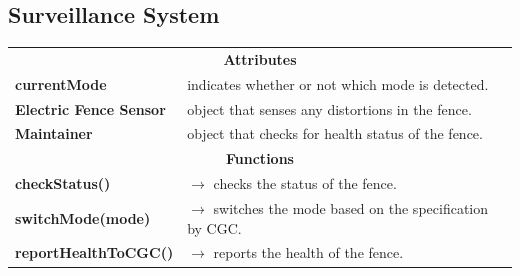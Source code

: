 \documentclass[12pt]{article}
\begin{document}
%

\subsection{Surveillance System}
\begin{table}[H]
\small
\begin{tabularx}{\hsize}{|X|X|}
    \hline
    \rowcolor{bigbrotheryellow}
    \multicolumn{2}{|c|}{\textbf{\texttt{ElectricFence}}} \\ 
    \hline
    \hline
    \multicolumn{2}{|c|}{\textbf{Attributes}}      \\
    \hline
    \textbf{currentMode} & indicates whether or not which mode is detected. \\
    \textbf{Electric Fence Sensor} &  object that senses any distortions in the fence.\\
    \textbf{Maintainer} &  object that checks for health status of the fence.\\
    \hline
    \multicolumn{2}{|c|}{\textbf{Functions}} \\
    \hline
    \textbf{checkStatus()} & $\rightarrow$ checks the status of the fence. \\
    \textbf{switchMode(mode)} & $\rightarrow$ switches the mode based on the specification by CGC. \\
    \textbf{reportHealthToCGC()} & $\rightarrow$ reports the health of the fence. \\
    \hline

\end{tabularx}
\end{table}
\end{document}
